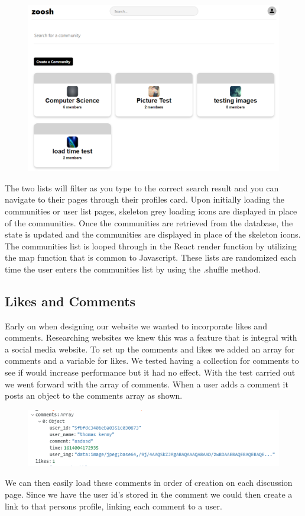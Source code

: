 \begin{figure}[H]
  \centering
  \includegraphics[scale=0.25]{img/communities.PNG}
  \label{fig:Communities within the website.}
\end{figure}

\newline 
The two lists will filter as you type to the correct search result and you can navigate to their pages through their profiles card. Upon initially loading the communities or user list pages, skeleton grey loading icons are displayed in place of the communities. Once the communities are retrieved from the database, the state is updated and the communities are displayed in place of the skeleton icons. The communities list is looped through in the React render function by utilizing the map function that is common to Javascript. These lists are randomized each time the user enters the communities list by using the .shuffle method.

\subsection{Likes and Comments}
Early on when designing our website we wanted to incorporate likes and comments. Researching websites we knew this was a feature that is integral with a social media website. To set up the comments and likes we added an array for comments and a variable for likes. We tested having a collection for comments to see if would increase performance but it had no effect. With the test carried out we went forward with the array of comments. When a user adds a comment it posts an object to the comments array as shown.
\begin{figure}[H]
  \centering
  \includegraphics[scale=1]{img/Commets_likes.PNG}
  \label{fig:Comments And likes}
\end{figure}
We can then easily load these comments in order of creation on each discussion page. Since we have the user id's stored in the comment we could then create a link to that persons profile, linking each comment to a user. 

